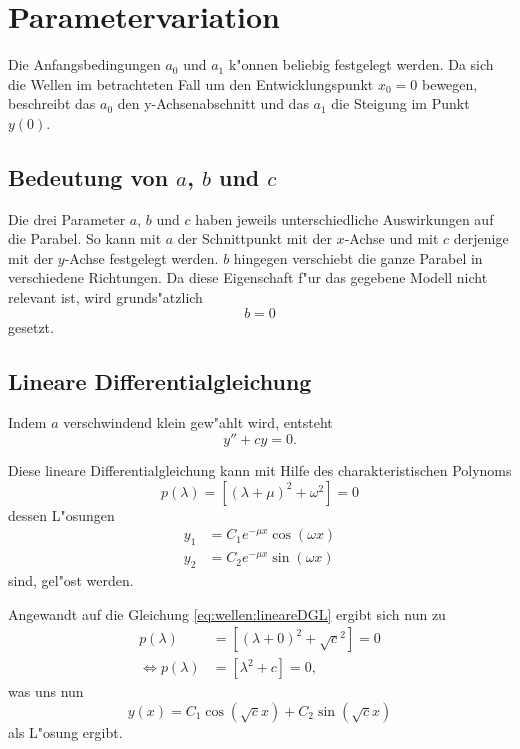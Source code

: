 \section{Parametervariation}
\label{sec:wellen:parametervariation}

Die Anfangsbedingungen $a_0$ und $a_1$ k"onnen beliebig festgelegt werden. Da 
sich die Wellen im betrachteten Fall um den Entwicklungspunkt $x_0=0$ bewegen, 
beschreibt das $a_0$ den y-Achsenabschnitt und das $a_1$ die Steigung im Punkt 
$y(0)$.

\subsection{Bedeutung von \texorpdfstring{$a$}{a}, \texorpdfstring{$b$}{b} und 
\texorpdfstring{$c$}{c}}
Die drei Parameter $a$, $b$ und $c$ haben jeweils unterschiedliche Auswirkungen 
auf die Parabel. So kann mit $a$ der Schnittpunkt mit der $x$-Achse und mit $c$ 
derjenige mit der $y$-Achse festgelegt werden. $b$ hingegen verschiebt die 
ganze Parabel in verschiedene Richtungen. Da diese Eigenschaft f"ur das 
gegebene Modell nicht relevant ist, wird grunds"atzlich
\begin{equation*}
	b = 0
\end{equation*}
gesetzt.

\subsection{Lineare Differentialgleichung}
\label{subsec:wellen:linearedifferntialgleichung}

Indem $a$ verschwindend klein gew"ahlt wird, entsteht
\begin{equation}
	y''+ cy = 0.
	\label{eq:wellen:lineareDGL}
\end{equation}

Diese lineare Differentialgleichung kann mit Hilfe des charakteristischen 
Polynoms
\begin{equation*}
	p(\lambda) = [(\lambda+\mu)^2+\omega^2] = 0
\end{equation*}
dessen L"osungen
\begin{equation*}
\begin{split}
	y_1 &= C_1e^{-\mu x}\cos(\omega x) \\
	y_2 &= C_2e^{-\mu x}\sin(\omega x)
\end{split}
\end{equation*}
sind, gel"ost werden.

Angewandt auf die Gleichung \ref{eq:wellen:lineareDGL} ergibt sich nun zu
\begin{equation*}
\begin{split}
	p(\lambda) &= [(\lambda+0)^2+\sqrt{c}^2] = 0 \\
	\Leftrightarrow p(\lambda) &= [\lambda^2+c] = 0,
\end{split}
\end{equation*}
was uns nun
\begin{equation}
y(x) = C_1 \cos(\sqrt{c}x) + C_2 \sin(\sqrt{c}x)
\label{eq:wellen:lsglineareDGL}
\end{equation}
als L"osung ergibt.

